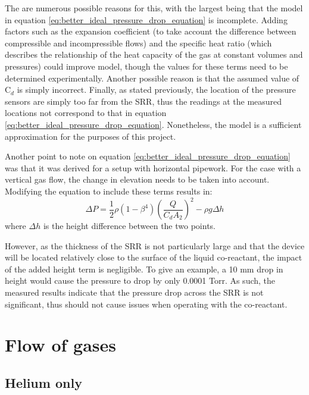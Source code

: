The are numerous possible reasons for this, with the largest being that the model in equation \ref{eq:better_ideal_pressure_drop_equation} is incomplete. Adding factors such as the expansion coefficient (to take account the difference between compressible and incompressible flows) and the specific heat ratio (which describes the relationship of the heat capacity of the gas at constant volumes and pressures) could improve model, though the values for these terms need to be determined experimentally. Another possible reason is that the assumed value of C$_d$ is simply incorrect. Finally, as stated previously, the location of the pressure sensors are simply too far from the SRR, thus the readings at the measured locations not correspond to that in equation \ref{eq:better_ideal_pressure_drop_equation}. Nonetheless, the model is a sufficient  approximation for the purposes of this project.

Another point to note on equation \ref{eq:better_ideal_pressure_drop_equation} was that it was derived for a setup with horizontal pipework. For the case with a vertical gas flow, the change in elevation needs to be taken into account. Modifying the equation to include these terms results in:
\begin{equation}
    \Delta P = \frac{1}{2} \rho \left (1 - \beta^4 \right )  \left (\frac{Q}{C_d A_2} \right )^2 - \rho g \Delta h
    \label{eq:better_ideal_pressure_drop_equation_for_vertical}
\end{equation}
where $\Delta h$ is the height difference between the two points. 

However, as the thickness of the SRR is not particularly large and that the device will be located relatively close to the surface of the liquid co-reactant, the impact of the added height term is negligible. To give an example, a 10 mm drop in height would cause the pressure to drop by only 0.0001 Torr. As such, the measured results indicate that the pressure drop across the SRR is not significant, thus should not cause issues when operating with the co-reactant.

\pagebreak


\section{Flow of gases}
\subsection{Helium only}


